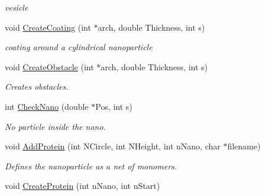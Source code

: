 \begin{DoxyCompactItemize}
\begin{DoxyCompactList}\small\item\em vesicle \end{DoxyCompactList}\item 
\hypertarget{classVarData_a1be90f419e3760d66e188cbee8222bcb}{void \hyperlink{classVarData_a1be90f419e3760d66e188cbee8222bcb}{\-Create\-Coating} (int $\ast$arch, double \-Thickness, int s)}\label{classVarData_a1be90f419e3760d66e188cbee8222bcb}

\begin{DoxyCompactList}\small\item\em coating around a cylindrical nanoparticle \end{DoxyCompactList}\item 
\hypertarget{classVarData_aa0b394048be15caa4b4a8c3599bffb6d}{void \hyperlink{classVarData_aa0b394048be15caa4b4a8c3599bffb6d}{\-Create\-Obstacle} (int $\ast$arch, double \-Thickness, int s)}\label{classVarData_aa0b394048be15caa4b4a8c3599bffb6d}

\begin{DoxyCompactList}\small\item\em \-Creates obstacles. \end{DoxyCompactList}\item 
\hypertarget{classVarData_abc3ca3798883d9b80ef3e40e692ab825}{int \hyperlink{classVarData_abc3ca3798883d9b80ef3e40e692ab825}{\-Check\-Nano} (double $\ast$\-Pos, int s)}\label{classVarData_abc3ca3798883d9b80ef3e40e692ab825}

\begin{DoxyCompactList}\small\item\em \-No particle inside the nano. \end{DoxyCompactList}\item 
\hypertarget{classVarData_a22dbbf0d52320459e74b307887332205}{void \hyperlink{classVarData_a22dbbf0d52320459e74b307887332205}{\-Add\-Protein} (int \-N\-Circle, int \-N\-Height, int n\-Nano, char $\ast$filename)}\label{classVarData_a22dbbf0d52320459e74b307887332205}

\begin{DoxyCompactList}\small\item\em \-Defines the nanoparticle as a net of monomers. \end{DoxyCompactList}\item 
\hypertarget{classVarData_abe734412a2e68af1fe7ab2a9e1ab33c2}{void \hyperlink{classVarData_abe734412a2e68af1fe7ab2a9e1ab33c2}{\-Create\-Protein} (int n\-Nano, int n\-Start)}\label{classVarData_abe734412a2e68af1fe7ab2a9e1ab33c2}


\end{DoxyCompactItemize}
